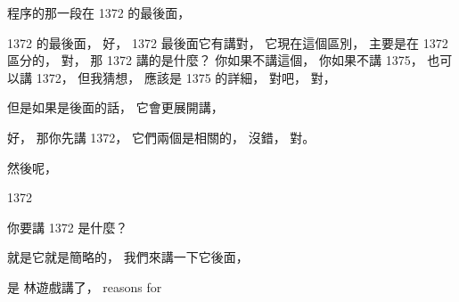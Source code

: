\hypertarget{w06:cue:2077}{}程序的那一段在 1372 的最後面，

\hypertarget{w06:cue:2078}{}1372 的最後面，
\hypertarget{w06:cue:2079}{}好，
\hypertarget{w06:cue:2080}{}1372 最後面它有講對，
\hypertarget{w06:cue:2081}{}它現在這個區別，
\hypertarget{w06:cue:2082}{}主要是在 1372 區分的，
\hypertarget{w06:cue:2083}{}對，
\hypertarget{w06:cue:2084}{}那 1372 講的是什麼？
\hypertarget{w06:cue:2085}{}你如果不講這個，
\hypertarget{w06:cue:2086}{}你如果不講 1375，
\hypertarget{w06:cue:2087}{}也可以講 1372，
\hypertarget{w06:cue:2088}{}但我猜想，
\hypertarget{w06:cue:2089}{}應該是 1375 的詳細，
\hypertarget{w06:cue:2090}{}對吧，
\hypertarget{w06:cue:2091}{}對，

\hypertarget{w06:cue:2092}{}但是如果是後面的話，
\hypertarget{w06:cue:2093}{}它會更展開講，

\hypertarget{w06:cue:2094}{}好，
\hypertarget{w06:cue:2095}{}那你先講 1372，
\hypertarget{w06:cue:2096}{}它們兩個是相關的，
\hypertarget{w06:cue:2097}{}沒錯，
\hypertarget{w06:cue:2098}{}對。

\hypertarget{w06:cue:2099}{}然後呢，

\hypertarget{w06:cue:2100}{}1372

\hypertarget{w06:cue:2101}{}你要講 1372 是什麼？

\hypertarget{w06:cue:2102}{}就是它就是簡略的，
\hypertarget{w06:cue:2103}{}我們來講一下它後面，

\hypertarget{w06:cue:2104}{}是 林遊戲講了，
\hypertarget{w06:cue:2105}{}reasons for

